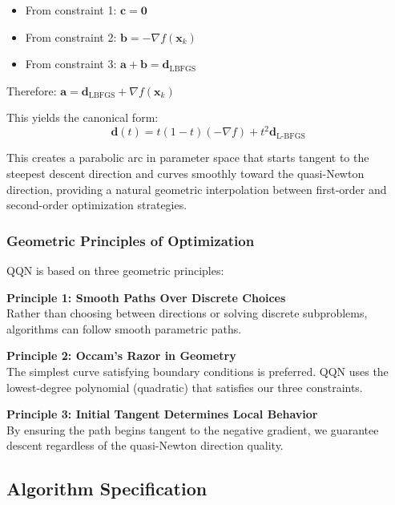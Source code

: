 \begin{itemize}
\tightlist
\item
  From constraint 1: \(\mathbf{c} = \mathbf{0}\)
\item
  From constraint 2: \(\mathbf{b} = -\nabla f(\mathbf{x}_k)\)
\item
  From constraint 3: \(\mathbf{a} + \mathbf{b} = \mathbf{d}_{\text{LBFGS}}\)
\end{itemize}

Therefore: \(\mathbf{a} = \mathbf{d}_{\text{LBFGS}} + \nabla f(\mathbf{x}_k)\)

This yields the canonical form:
\[\mathbf{d}(t) = t(1-t)(-\nabla f) + t^2 \mathbf{d}_{\text{L-BFGS}}\]

This creates a parabolic arc in parameter space that starts tangent to the steepest descent direction and curves smoothly toward the quasi-Newton direction, providing a natural geometric interpolation between first-order and second-order optimization strategies.

\hypertarget{geometric-principles-of-optimization}{%
\subsubsection{Geometric Principles of Optimization}\label{geometric-principles-of-optimization}}

QQN is based on three geometric principles:

\textbf{Principle 1: Smooth Paths Over Discrete Choices}\\
Rather than choosing between directions or solving discrete subproblems, algorithms can follow smooth parametric paths.

\textbf{Principle 2: Occam's Razor in Geometry}\\
The simplest curve satisfying boundary conditions is preferred. QQN uses the lowest-degree polynomial (quadratic) that satisfies our three constraints.

\textbf{Principle 3: Initial Tangent Determines Local Behavior}\\
By ensuring the path begins tangent to the negative gradient, we guarantee descent regardless of the quasi-Newton direction quality.

\hypertarget{algorithm-specification}{%
\subsection{Algorithm Specification}\label{algorithm-specification}}

